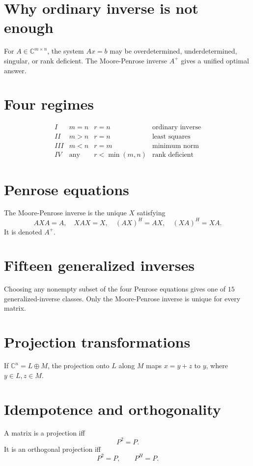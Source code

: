 
\section{Why ordinary inverse is not enough}
For \(A\in\mathbb C^{m\times n}\), the system \(Ax=b\) may be overdetermined, underdetermined, singular, or rank deficient.  The Moore-Penrose inverse \(A^+\) gives a unified optimal answer.

\section{Four regimes}
\[
\begin{array}{c|c|c|c}
I&m=n&r=n&\text{ordinary inverse}\\
II&m>n&r=n&\text{least squares}\\
III&m<n&r=m&\text{minimum norm}\\
IV&\text{any}&r<\min(m,n)&\text{rank deficient}
\end{array}
\]

\section{Penrose equations}
The Moore-Penrose inverse is the unique \(X\) satisfying
\[
  AXA=A,\quad XAX=X,\quad (AX)^H=AX,\quad (XA)^H=XA.
\]
It is denoted \(A^+\).

\section{Fifteen generalized inverses}
Choosing any nonempty subset of the four Penrose equations gives one of \(15\) generalized-inverse classes.  Only the Moore-Penrose inverse is unique for every matrix.

\section{Projection transformations}
If \(\mathbb C^n=L\oplus M\), the projection onto \(L\) along \(M\) maps \(x=y+z\) to \(y\), where \(y\in L,z\in M\).

\section{Idempotence and orthogonality}
A matrix is a projection iff
\[
  P^2=P.
\]
It is an orthogonal projection iff
\[
  P^2=P,\qquad P^H=P.
\]

